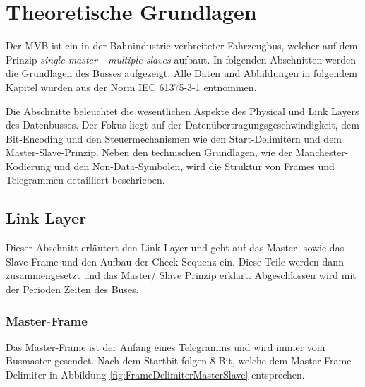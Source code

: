 



\chapter{Theoretische Grundlagen} %
\label{Chapter2TheoretischeGrundlagen} %
Der MVB ist ein in der Bahnindustrie verbreiteter Fahrzeugbus, welcher auf dem Prinzip \textit{single master - multiple slaves} aufbaut. In folgenden Abschnitten werden die Grundlagen des Busses aufgezeigt. Alle Daten und Abbildungen in folgendem Kapitel wurden aus der Norm IEC 61375-3-1 entnommen. \cite{MVB_Norm} 

Die Abschnitte beleuchtet die wesentlichen Aspekte des Physical und Link Layers des Datenbusses. Der Fokus liegt auf der Datenübertragungsgeschwindigkeit, dem Bit-Encoding und den Steuermechanismen wie den Start-Delimitern und dem Master-Slave-Prinzip. Neben den technischen Grundlagen, wie der Manchester-Kodierung und den Non-Data-Symbolen, wird die Struktur von Frames und Telegrammen detailliert beschrieben.


\section{Link Layer}

Dieser Abschnitt erläutert den Link Layer und geht auf das Master- sowie das Slave-Frame und den Aufbau der Check Sequenz ein. Diese Teile werden dann zusammengesetzt und das Master/ Slave Prinzip erklärt. Abgeschlossen wird mit der Perioden Zeiten des Buses.


\subsection{Master-Frame}
\label{sub:MasterFrame}
Das Master-Frame ist der Anfang eines Telegramms und wird immer vom Busmaster gesendet. Nach dem Startbit folgen 8 Bit, welche dem Master-Frame Delimiter in Abbildung \ref{fig:FrameDelimiterMasterSlave} entsprechen. 

